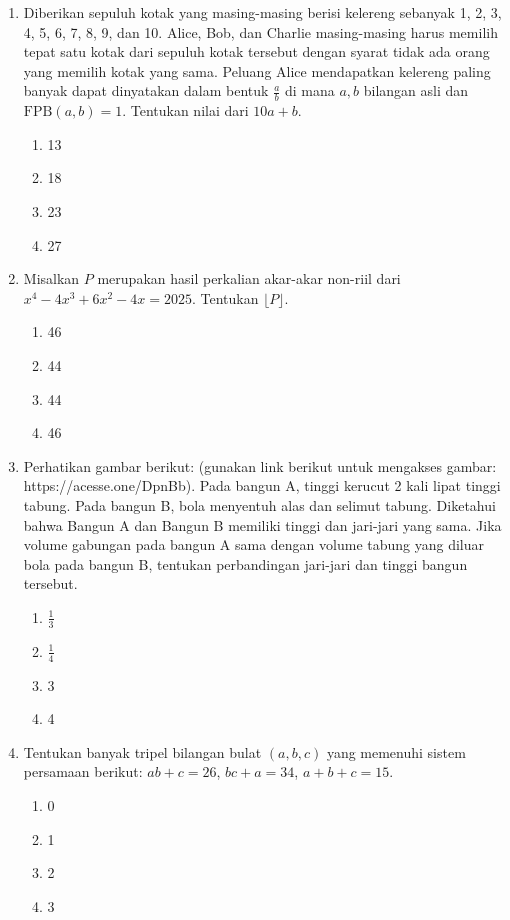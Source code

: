 \documentclass[12pt]{scrartcl}
\begin{document}
\begin{enumerate}
    \item Diberikan sepuluh kotak yang masing-masing berisi kelereng sebanyak 1, 2, 3, 4, 5, 6, 7, 8, 9, dan 10. Alice, Bob, dan Charlie masing-masing harus memilih tepat satu kotak dari sepuluh kotak tersebut dengan syarat tidak ada orang yang memilih kotak yang sama. Peluang Alice mendapatkan kelereng paling banyak dapat dinyatakan dalam bentuk $\frac{a}{b}$ di mana $a, b$ bilangan asli dan $\text{FPB}(a,b)=1$. Tentukan nilai dari $10a+b$.
    \begin{enumerate}
        \item 13
        \item 18
        \item 23
        \item 27
    \end{enumerate}

    \item Misalkan $P$ merupakan hasil perkalian akar-akar non-riil dari $x^{4}-4x^{3}+6x^{2}-4x=2025$. Tentukan $\lfloor P \rfloor$.
    \begin{enumerate}
        \item 46
        \item 44
        \item 44
        \item 46
    \end{enumerate}

    \item Perhatikan gambar berikut: (gunakan link berikut untuk mengakses gambar: https://acesse.one/DpnBb). Pada bangun A, tinggi kerucut 2 kali lipat tinggi tabung. Pada bangun B, bola menyentuh alas dan selimut tabung. Diketahui bahwa Bangun A dan Bangun B memiliki tinggi dan jari-jari yang sama. Jika volume gabungan pada bangun A sama dengan volume tabung yang diluar bola pada bangun B, tentukan perbandingan jari-jari dan tinggi bangun tersebut.
    \begin{enumerate}
        \item $\frac{1}{3}$
        \item $\frac{1}{4}$
        \item 3
        \item 4
    \end{enumerate}

    \item Tentukan banyak tripel bilangan bulat $(a, b, c)$ yang memenuhi sistem persamaan berikut: 
    $ab+c=26$, $bc+a=34$, $a+b+c=15$.
    \begin{enumerate}
        \item 0
        \item 1
        \item 2
        \item 3
    \end{enumerate}


\end{enumerate}
\end{document}
